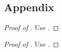 \subsection*{Appendix}

\begin{proof}[Proof of ]
  Use .
\end{proof}

\begin{proof}[Proof of ]
  Use .
\end{proof}
